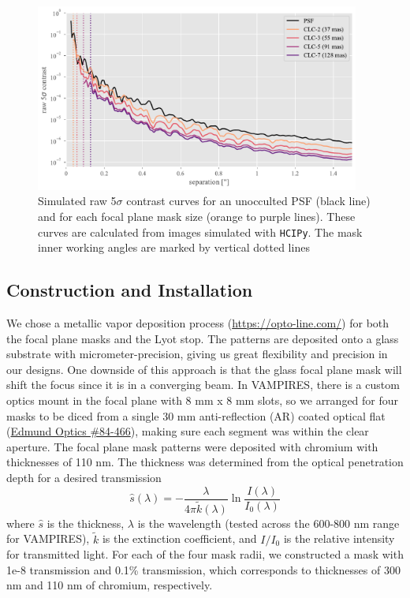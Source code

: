 \documentclass[]{spie}  %
\begin{document}
\begin{figure}
   \centering
   \includegraphics[width=0.95\textwidth]{figures/simulated_curves}
   \caption{Simulated raw 5$\sigma$ contrast curves for an unocculted PSF (black line) and for each focal plane mask size (orange to purple lines). These curves are calculated from images simulated with \texttt{HCIPy}. The mask inner working angles are marked by vertical dotted lines}\label{fig:sim-contrast}
\end{figure}

\subsection{Construction and Installation}\label{sec:install}

We chose a metallic vapor deposition process (\url{https://opto-line.com/}) for both the focal plane masks and the Lyot stop. The patterns are deposited onto a glass substrate with micrometer-precision, giving us great flexibility and precision in our designs. One downside of this approach is that the glass focal plane mask will shift the focus since it is in a converging beam. In VAMPIRES, there is a custom optics mount in the focal plane with 8 mm x 8 mm slots, so we arranged for four masks to be diced from a single 30 mm anti-reflection (AR) coated optical flat (\href{https://www.edmundoptics.com/p/30mm-dia-4mm-thick-nir-i-coated-lambda10-fused-silica-window/27562/}{Edmund Optics \#84-466}), making sure each segment was within the clear aperture. The focal plane mask patterns were deposited with chromium with thicknesses of 110 nm. The thickness was determined from the optical penetration depth for a desired transmission
\begin{equation}
    \hat{s}(\lambda) = -\frac{\lambda}{4\pi\tilde{k}(\lambda)}\ln{\frac{I(\lambda)}{I_0(\lambda)}}
    \label{eqn:throughput}
\end{equation}
where $\hat{s}$ is the thickness, $\lambda$ is the wavelength (tested across the 600-800 nm range for VAMPIRES), $\tilde{k}$ is the extinction coefficient, and $I/I_0$ is the relative intensity for transmitted light. For each of the four mask radii, we constructed a mask with 1e-8 transmission and 0.1\% transmission, which corresponds to thicknesses of 300 nm and 110 nm of chromium, respectively.
\end{document}
